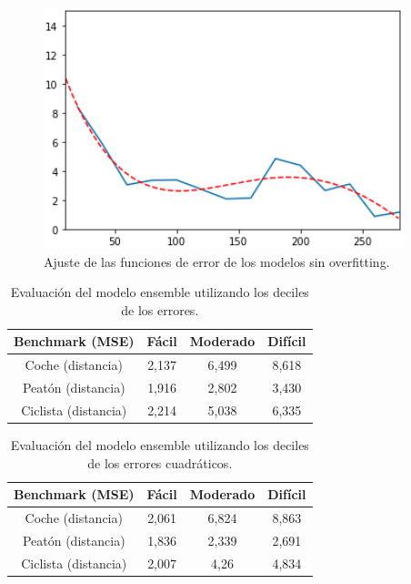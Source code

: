 \begin{figure}[H]
\begin{minipage}{0.32\textwidth}
		\includegraphics[width=1\linewidth]{Book/figures/6_approx_distancia/ensemble_not_overfitting_2.png}
	\end{minipage}
	\caption{Ajuste de las funciones de error de los modelos sin overfitting.}
	\label{fig:Ajuste de las funciones de error de los modelos sin overfitting.}
\end{figure}

\begin{table}[H]
\centering
\begin{tabular}{|c|c|c|c|}
\hline
\textbf{Benchmark (MSE)} & \textbf{Fácil} & \textbf{Moderado} & \textbf{Difícil}\\ \hline \hline
Coche (distancia)        & 2,137          & 6,499             & 8,618\\ \hline
Peatón (distancia)       & 1,916          & 2,802             & 3,430\\ \hline
Ciclista (distancia)     & 2,214          & 5,038             & 6,335\\ \hline
\end{tabular}
\caption{Evaluación del modelo ensemble utilizando los deciles de los errores.}
\label{fig:Evaluación del modelo ensemble utilizando los deciles de los errores.}
\end{table}

\begin{table}[H]
\centering
\begin{tabular}{|c|c|c|c|}
\hline
\textbf{Benchmark (MSE)} & \textbf{Fácil} & \textbf{Moderado} & \textbf{Difícil}\\ \hline \hline
Coche (distancia)        & 2,061          & 6,824             & 8,863\\ \hline
Peatón (distancia)       & 1,836          & 2,339             & 2,691\\ \hline
Ciclista (distancia)     & 2,007          & 4,26             & 4,834\\ \hline
\end{tabular}
\caption{Evaluación del modelo ensemble utilizando los deciles de los errores cuadráticos.}
\label{fig:Evaluación del modelo ensemble utilizando los deciles de los errores cuadráticos.}
\end{table}

